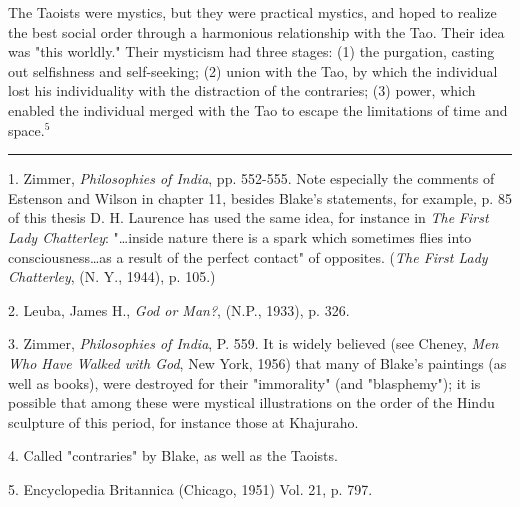 \begin{center}
	\parbox{0.8\textwidth}{
		\hspace*{5mm}The Taoists were mystics, but they were practical
		mystics, and hoped to realize the best social order through
		a harmonious relationship with the Tao. Their idea was
		"this worldly." Their mysticism had three stages: (1) the
		purgation, casting out selfishness and self-seeking; (2)
		union with the Tao, by which the individual lost his individuality
		with the distraction of the contraries; (3) power,
		which enabled the individual merged with the Tao to escape
		the limitations of time and space.$^{5}$\par
	}%
\end{center}
\vspace*{\fill}
\noindent\rule{0.25\textwidth}{0.4pt}\par
1. Zimmer, \textit{Philosophies of India}, pp. 552-555. Note
especially the comments of Estenson and Wilson in chapter 11,
besides Blake's statements, for example, p. 85 of this thesis
D. H. Laurence has used the same idea, for instance in \textit{The}
\textit{First Lady Chatterley}: "\dots inside nature there is a spark
which sometimes flies into consciousness\dots as a result of the
perfect contact" of opposites. (\textit{The First Lady Chatterley},
(N. Y., 1944), p. 105.)\par
2. Leuba, James H., \textit{God or Man?}, (N.P., 1933), p. 326.\par
3. Zimmer, \textit{Philosophies of India}, P. 559. It is widely believed
(see Cheney, \textit{Men Who Have Walked with God}, New York,
1956) that many of Blake's paintings (as well as books), were
destroyed for their "immorality" (and "blasphemy"); it is
possible that among these were mystical illustrations on the
order of the Hindu sculpture of this period, for instance
those at Khajuraho.\par
4. Called "contraries" by Blake, as well as the Taoists.\par
5. Encyclopedia Britannica (Chicago, 1951) Vol. 21, p. 797.\par

\newpage


{}

